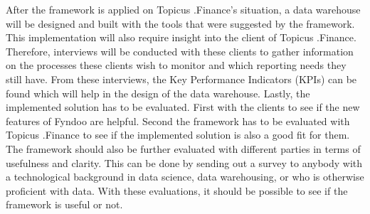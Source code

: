 \documentclass[11pt]{article}
\begin{document}
After the framework is applied on Topicus .Finance's situation, a data warehouse will be designed and built with the tools that were suggested by the framework. This implementation will also require insight into the client of Topicus .Finance. Therefore, interviews will be conducted with these clients to gather information on the processes these clients wish to monitor and which reporting needs they still have. From these interviews, the Key Performance Indicators (KPIs) can be found which will help in the design of the data warehouse. Lastly, the implemented solution has to be evaluated. First with the clients to see if the new features of Fyndoo are helpful. Second the framework has to be evaluated with Topicus .Finance to see if the implemented solution is also a good fit for them. The framework should also be further evaluated with different parties in terms of usefulness and clarity. This can be done by sending out a survey to anybody with a technological background in data science, data warehousing, or who is otherwise proficient with data. With these evaluations, it should be possible to see if the framework is useful or not. \\
\end{document}
